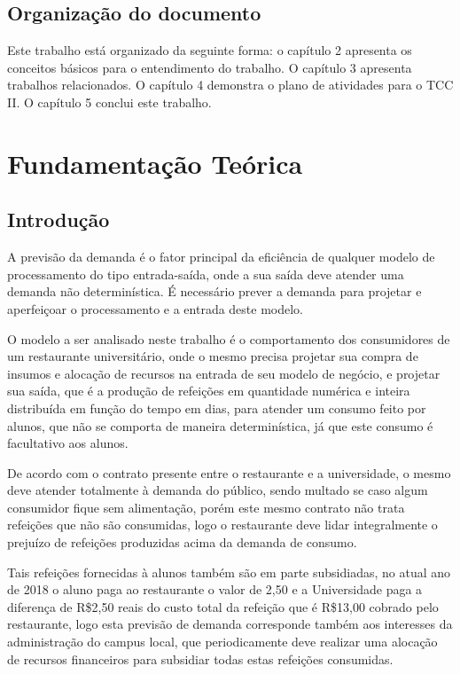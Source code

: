 \documentclass[	12pt, Times, openright, twoside, a4paper, english, brazil]{abntex2}
\begin{document}
\section{Organização do documento}
Este trabalho está organizado da seguinte forma: o capítulo 2 apresenta os conceitos básicos para o entendimento do trabalho. O capítulo 3 apresenta trabalhos relacionados. O capítulo 4 demonstra o plano de atividades para o TCC II. O capítulo 5 conclui este trabalho.
\chapter{Fundamentação Teórica}
\section{Introdução}
A previsão da demanda é o fator principal da eficiência de qualquer modelo de processamento do tipo entrada-saída, onde a sua saída deve atender uma demanda não determinística. É necessário prever a demanda para projetar e aperfeiçoar o processamento e a entrada deste modelo. 

O modelo a ser analisado neste trabalho é o comportamento dos consumidores de um restaurante universitário, onde o mesmo precisa projetar sua compra de insumos e alocação de recursos na entrada de seu modelo de negócio, e projetar sua saída, que é a produção de refeições em quantidade numérica e inteira distribuída em função do tempo em dias, para atender um consumo feito por alunos, que não se comporta de maneira determinística, já que este consumo é facultativo aos alunos.

De acordo com o contrato presente entre o restaurante e a universidade, o mesmo deve atender totalmente à demanda do público, sendo multado se caso algum consumidor fique sem alimentação, porém este mesmo contrato não trata refeições que não são consumidas, logo o restaurante deve lidar integralmente o prejuízo de refeições produzidas acima da demanda de consumo.

Tais refeições fornecidas à alunos também são em parte subsidiadas, no atual ano de 2018 o aluno paga ao restaurante o valor de 2,50 e a Universidade paga a diferença de R\$2,50 reais do custo total da refeição que é R\$13,00 cobrado pelo restaurante, logo esta previsão de demanda corresponde também aos interesses da administração do campus local, que periodicamente deve realizar uma alocação de recursos financeiros para subsidiar todas estas refeições consumidas.
\end{document}
